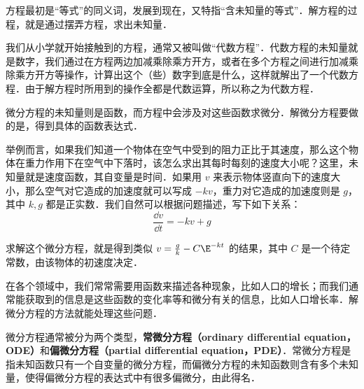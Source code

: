 

方程最初是“等式”的同义词，发展到现在，又特指“含未知量的等式”．解方程的过程，就是通过摆弄方程，求出未知量．

我们从小学就开始接触到的方程，通常又被叫做“代数方程”．代数方程的未知量就是数字，我们通过在方程两边加减乘除乘方开方，或者在多个方程之间进行加减乘除乘方开方等操作，计算出这个（些）数字到底是什么，这样就解出了一个代数方程．由于解方程时所用到的操作全都是代数运算，所以称之为代数方程．

微分方程的未知量则是函数，而方程中会涉及对这些函数求微分．解微分方程要做的是，得到具体的函数表达式．

举例而言，如果我们知道一个物体在空气中受到的阻力正比于其速度，那么这个物体在重力作用下在空气中下落时，该怎么求出其每时每刻的速度大小呢？这里，未知量就是速度函数，其自变量是时间．如果用 $v$ 来表示物体竖直向下的速度大小，那么空气对它造成的加速度就可以写成 $-kv$，重力对它造成的加速度则是 $g$，其中 $k, g$ 都是正实数．我们自然可以根据问题描述，写下如下关系：
\begin{equation}
\frac{\dd v}{\dd t}=-kv+g
\end{equation}

求解这个微分方程，就是得到类似 $v=\frac{g}{k}- C\E^{-kt}$ 的结果，其中 $C$ 是一个待定常数，由该物体的初速度决定．

在各个领域中，我们常常需要用函数来描述各种现象，比如人口的增长；而我们通常能获取到的信息是这些函数的变化率等和微分有关的信息，比如人口增长率．解微分方程的方法就能处理这些问题．

微分方程通常被分为两个类型，\textbf{常微分方程（ordinary differential equation，ODE）}和\textbf{偏微分方程（partial differential equation，PDE）}．常微分方程是指未知函数只有一个自变量的微分方程，而偏微分方程的未知函数则含有多个未知量，使得偏微分方程的表达式中有很多偏微分，由此得名．


















